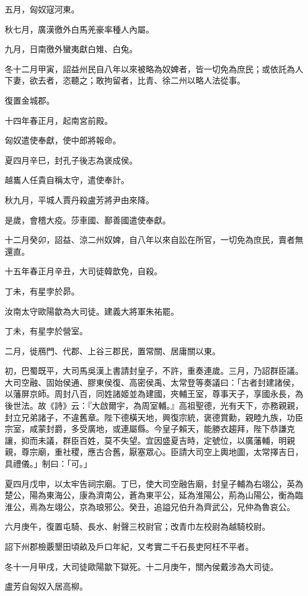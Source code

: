 \begin{pinyinscope}
五月，匈奴寇河東。

秋七月，廣漢徼外白馬羌豪率種人內屬。

九月，日南徼外蠻夷獻白雉、白兔。

冬十二月甲寅，詔益州民自八年以來被略為奴婢者，皆一切免為庶民；或依託為人下妻，欲去者，恣聽之；敢拘留者，比青、徐二州以略人法從事。

復置金城郡。

十四年春正月，起南宮前殿。

匈奴遣使奉獻，使中郎將報命。

夏四月辛巳，封孔子後志為褒成侯。

越巂人任貴自稱太守，遣使奉計。

秋九月，平城人賈丹殺盧芳將尹由來降。

是歲，會稽大疫。莎車國、鄯善國遣使奉獻。

十二月癸卯，詔益、涼二州奴婢，自八年以來自訟在所官，一切免為庶民，賣者無還直。

十五年春正月辛丑，大司徒韓歆免，自殺。

丁未，有星孛於昴。

汝南太守歐陽歙為大司徒。建義大將軍朱祐罷。

丁未，有星孛於營室。

二月，徙鴈門、代郡、上谷三郡民，置常關、居庸關以東。

初，巴蜀既平，大司馬吳漢上書請封皇子，不許，重奏連歲。三月，乃詔群臣議。大司空融、固始侯通、膠東侯復、高密侯禹、太常登等奏議曰：「古者封建諸侯，以藩屏京師。周封八百，同姓諸姬並為建國，夾輔王室，尊事天子，享國永長，為後世法。故《詩》云：『大啟爾宇，為周室輔。』高祖聖德，光有天下，亦務親親，封立兄弟諸子，不違舊章。陛下德橫天地，興復宗統，褒德賞勳，親睦九族，功臣宗室，咸蒙封爵，多受廣地，或連屬縣。今皇子賴天，能勝衣趨拜，陛下恭謙克讓，抑而未議，群臣百姓，莫不失望。宜因盛夏吉時，定號位，以廣藩輔，明親親，尊宗廟，重社稷，應古合舊，厭塞眾心。臣請大司空上輿地圖，太常擇吉日，具禮儀。」制曰：「可。」

夏四月戊申，以太牢告祠宗廟。丁巳，使大司空融告廟，封皇子輔為右翊公，英為楚公，陽為東海公，康為濟南公，蒼為東平公，延為淮陽公，荊為山陽公，衡為臨淮公，焉為左翊公，京為琅邪公。癸丑，追謚兄伯升為齊武公，兄仲為魯哀公。

六月庚午，復置屯騎、長水、射聲三校尉官；改青巾左校尉為越騎校尉。

詔下州郡檢覈墾田頃畝及戶口年紀，又考實二千石長吏阿枉不平者。

冬十一月甲戌，大司徒歐陽歙下獄死。十二月庚午，關內侯戴涉為大司徒。

盧芳自匈奴入居高柳。


\end{pinyinscope}
